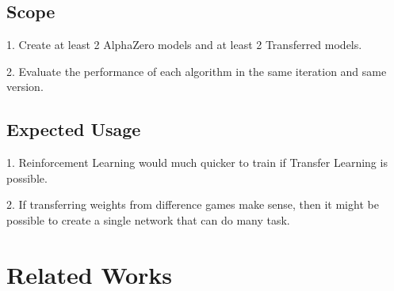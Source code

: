 \documentclass[12pt,a4paper]{report}
\begin{document}
\section{Scope}
{
\hspace{0.6cm} 1. Create at least 2 AlphaZero models and at least 2 Transferred models.\par
\hspace{0cm} 2. Evaluate the performance of each algorithm in the same iteration and same version.\par
}
\section{Expected Usage}
{
\hspace{0.6cm} 1. Reinforcement Learning would much quicker to train if Transfer Learning is possible.\par
\hspace{0cm}2. If transferring weights from difference games make sense, then it might be possible to create a single network that can do many task.
}
\clearpage

\chapter{Related Works}\thispagestyle{fancy}
\end{document}
